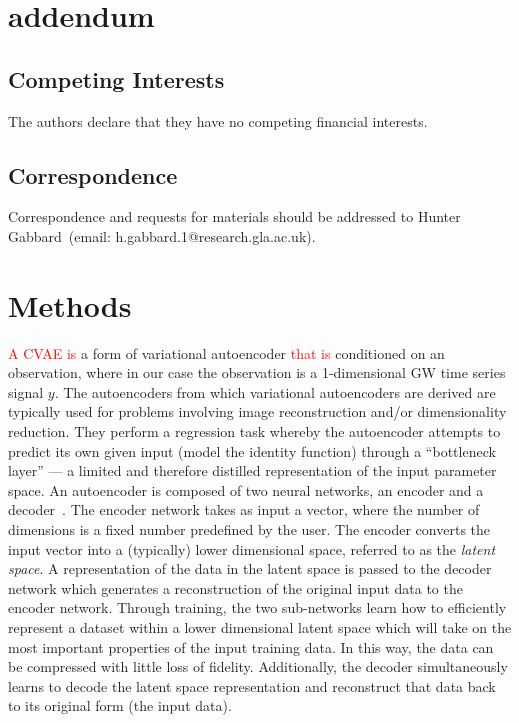 \documentclass[%
showpacs,
nofootinbib,
 amsmath,amssymb,
 aps,
 twocolumn,
 prl,
 reprint,
floatfix,
]{revtex4-1}
\newcommand{\new}[1]{\textcolor{red}{#1}}
\begin{document}
\section{addendum}
 \subsection{Competing Interests} 
    The authors declare that they have no competing financial interests.
 \subsection{Correspondence} Correspondence and requests for materials should be addressed to Hunter Gabbard~(email: h.gabbard.1@research.gla.ac.uk).

%
%
\section{Methods}\label{sec:methods}
%

%
%
\new{A \ac{CVAE} is} a form of variational autoencoder \new{that is}
conditioned on an observation, where in our case the observation is a
1-dimensional \ac{GW} time series signal $y$. The autoencoders from which
variational autoencoders are derived are typically used for problems involving
image reconstruction and/or dimensionality reduction. They perform a regression
task whereby the autoencoder attempts to predict its own given input (model the
identity function) through a ``bottleneck layer'' --- a limited  and therefore
distilled representation of the input parameter space. An autoencoder is
composed of two neural networks, an encoder and a
decoder~\cite{gallinari1987memoires}.  The encoder network takes as input a
vector, where the number of dimensions is a fixed number predefined by the
user. The encoder converts the input vector into a (typically) lower
dimensional space, referred to as the {\it{latent space}}. A representation of
the data in the latent space is passed to the decoder network which generates a
reconstruction of the original input data to the encoder network. Through
training, the two sub-networks learn how to efficiently represent a dataset
within a lower dimensional latent space which will take on the most important
properties of the input training data. In this way, the data can be compressed
with little loss of fidelity. Additionally, the decoder simultaneously learns
to decode the latent space representation and reconstruct that data back to its
original form (the input data).
\end{document}
